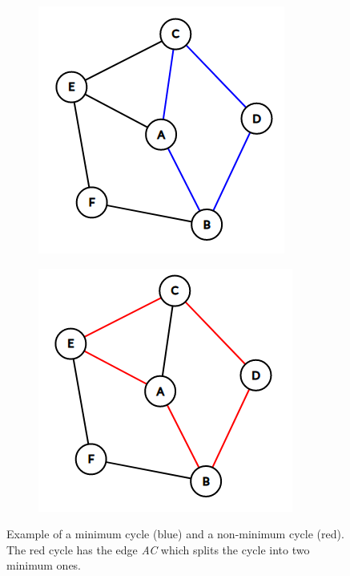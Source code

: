 \begin{figure}[h!]
  \centering
  \begin{subfigure}[b]{0.28\textwidth}
    \includegraphics[width=\textwidth]{figure/blockgen1.png}
  \end{subfigure}
  \begin{subfigure}[b]{0.28\textwidth}
    \includegraphics[width=\textwidth]{figure/blockgen2.png}
  \end{subfigure}

  \caption{Example of a minimum cycle (blue) and a non-minimum cycle (red). The red cycle has the edge \textit{AC} which splits the cycle into two minimum ones.}
  \label{fig:graph_cycles}
\end{figure}


